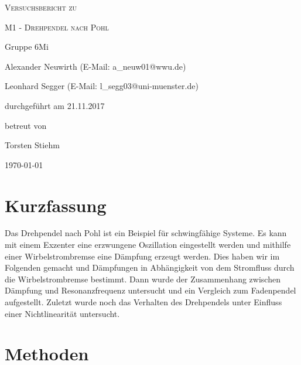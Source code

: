 \documentclass[
	a4paper,
	12pt,
	pagesize,
	ngerman
]{scrartcl}
\begin{document}
	
	\begin{titlepage}
		\centering
		{\scshape\LARGE Versuchsbericht zu \par}
		\vspace{1cm}
		{\scshape\huge M1 - Drehpendel nach Pohl\par}
		\vspace{2.5cm}
		{\LARGE Gruppe 6Mi \par}
		\vspace{0.5cm}
		
		{\large Alexander Neuwirth (E-Mail: a\_neuw01@wwu.de) \par}
		{\large Leonhard Segger (E-Mail: l\_segg03@uni-muenster.de) \par}
		\vfill
		
		durchgeführt am 21.11.2017\par
		betreut von\par
		{\large Torsten Stiehm}
		
		\vfill
		
		{\large \today\par}
	\end{titlepage}
	\tableofcontents
	\newpage
	
	\section{Kurzfassung}
	Das Drehpendel nach Pohl ist ein Beispiel für schwingfähige Systeme. Es kann mit einem Exzenter eine erzwungene Oszillation eingestellt werden und mithilfe einer Wirbelstrombremse eine Dämpfung erzeugt werden. Dies haben wir im Folgenden gemacht und Dämpfungen in Abhängigkeit von dem Stromfluss durch die Wirbelstrombremse bestimmt. Dann wurde der Zusammenhang zwischen Dämpfung und Resonanzfrequenz untersucht und ein Vergleich zum Fadenpendel aufgestellt.
	Zuletzt wurde noch das Verhalten des Drehpendels unter Einfluss einer Nichtlinearität untersucht.
	\section{Methoden}
	
\end{document}
